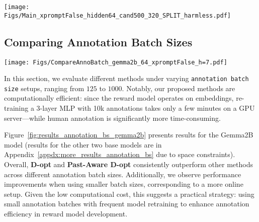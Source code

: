 \begin{figure*}[ht!]
    \centering
    \texttt{[image: Figs/Main\_xpromptFalse\_hidden64\_cand500\_320\_SPLIT\_harmless.pdf]} \vspace{-0.2cm}
    \caption{\small Comparing annotation efficiency of different methods. (\texttt{Harmless} Dataset, 3 Models, 8 Methods). First row: $1 -$ Spearman's Correlation (\textbf{lower is better}); second row: Best-of-N reward (\textbf{higher is better}). Experiments are repeated with 5 seeds.}
    \label{fig:results_main}
\end{figure*}

\subsection{Comparing Annotation Batch Sizes}

\begin{figure*}[ht!]
    \centering
    \texttt{[image: Figs/CompareAnnoBatch\_gemma2b\_64\_xpromptFalse\_h=7.pdf]} \vspace{-0.2cm}
    \caption{\small Investigating how annotation batch size choices affect learning performance of our methods. Model: Gemma 2B. The first two columns present results on the \texttt{Harmless} dataset, and the second two columns present results on the \texttt{Helpful} dataset. First row: $1 -$ Spearman's Correlation (\textbf{lower is better}); second row: Best-of-N reward (\textbf{higher is better}). The results presented are from 5 runs with different seeds.}\vspace{-0.2cm}
    \label{fig:results_annotation_bs_gemma2b}
\end{figure*}
In this section, we evaluate different methods under varying \texttt{annotation batch size} setups, ranging from $125$ to $1000$. Notably, our proposed methods are computationally efficient: since the reward model operates on embeddings, re-training a 3-layer MLP with 10k annotations takes only a few minutes on a GPU server—while human annotation is significantly more time-consuming.

Figure~\ref{fig:results_annotation_bs_gemma2b} presents results for the Gemma2B model (results for the other two base models are in Appendix~\ref{appdx:more_results_annotation_bs} due to space constraints). Overall, \textbf{D-opt} and \textbf{Past-Aware D-opt} consistently outperform other methods across different annotation batch sizes. Additionally, we observe performance improvements when using smaller batch sizes, corresponding to a more online setup. Given the low computational cost, this suggests a practical strategy: using small annotation batches with frequent model retraining to enhance annotation efficiency in reward model development.


